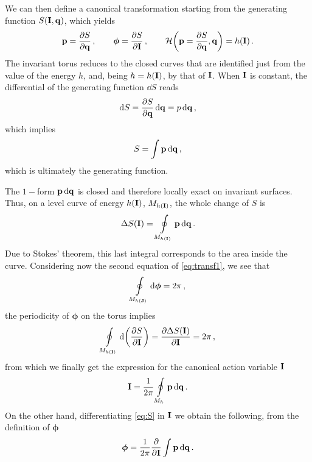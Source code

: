 We can then define a canonical transformation starting from the generating function $S(\vb{I},\vb{q})$, which yields
%
\begin{equation}
  \vb{p}=\pdv{S}{\vb{q}}\,, \qquad \boldsymbol{\phi}=\pdv{S}{\vb{I}}\,, \qquad \mathcal{H}\qty(\vb{p}=\pdv{S}{\vb{q}},\vb{q}) = h(\vb{I})\,.
  \label{eq:transf1}
  \end{equation} 
%
The invariant torus reduces to the closed curves that are identified just from the value of the energy $h$, and, being $h=h(\vb{I})$, by that of $\vb{I}$. When $\vb{I}$ is constant, the differential of the generating function $\dd S$ reads
%
\begin{equation} 
    \dd S = \pdv{S}{\vb{q}}\,\dd \vb{q} = p\,\dd \vb{q}\,,
\end{equation} 
%
which implies
%
\begin{equation}
    S = \int \vb{p}\, \dd \vb{q}\,,
    \label{eq:S}
\end{equation} 
%
which is ultimately the generating function.

The $1-$form $\vb{p}\,\dd \vb{q}$ is closed and therefore locally exact on invariant surfaces. Thus, on a level curve of energy $h(\vb{I})$, $M_{h(\vb{I})}$, the whole change of $S$ is
%
\begin{equation}
    \Delta S(\vb{I}) = \oint\displaylimits_{M_{h(\vb{I})}} \vb{p}\, \dd \vb{q} \,.
\end{equation} 
%
Due to Stokes' theorem, this last integral corresponds to the area inside the curve.  Considering now the second equation of \eqref{eq:transf1}, we see that
%
\begin{equation} 
    \oint\displaylimits_{M_{h(\vb{J})}} \dd\boldsymbol{\phi} = 2\pi\,,  
\end{equation} 
%
the periodicity of $\boldsymbol{\phi}$ on the torus implies
%
\begin{equation} 
    \oint\displaylimits_{M_{h(\vb{I})}} \dd\qty(\pdv{S}{\vb{I}}) = \pdv{\Delta S(\vb{I})}{\vb{I}} = 2\pi\,, 
\end{equation}
%
from which we finally get the expression for the canonical action variable $\vb{I}$
%
\begin{equation}  
    \vb{I} = \frac{1}{2\pi}\oint\displaylimits_{M_h} \vb{p}\,\dd \vb{q}\,.  
\end{equation} 
%
On the other hand, differentiating \eqref{eq:S} in $\vb{I}$ we obtain the following, from the definition of $\boldsymbol{\phi}$
%
\begin{equation} 
    \boldsymbol{\phi} = \frac{1}{2\pi} \pdv{\vb{I}}\int \vb{p}\,\dd \vb{q}\, . 
\end{equation}  

